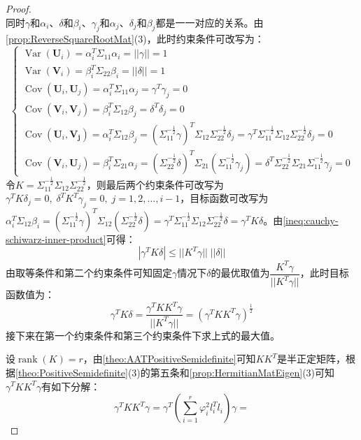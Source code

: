 \begin{proof}
\begin{equation*}
	\end{equation*}
	同时$\gamma$和$\alpha_i$、$\delta$和$\beta_i$、$\gamma_j$和$\alpha_j$、$\delta_j$和$\beta_j$都是一一对应的关系。由\cref{prop:ReverseSquareRootMat}(3)，此时约束条件可改写为：
	\begin{equation*}
		\begin{cases}
			\operatorname{Var}(\mathbf{U}_i)=\alpha_i^T\Sigma_{11}\alpha_i=||\gamma||=1 \\
			\operatorname{Var}(\mathbf{V}_i)=\beta_i^T\Sigma_{22}\beta_i=||\delta||=1 \\
			\operatorname{Cov}(\mathbf{U}_i,\mathbf{U}_j)=\alpha_i^T\Sigma_{11}\alpha_j=\gamma^T\gamma_j=0 \\
			\operatorname{Cov}(\mathbf{V}_i,\mathbf{V}_j)=\beta_i^T\Sigma_{12}\beta_j=\delta^T\delta_j=0 \\
			\operatorname{Cov}(\mathbf{U}_i,\mathbf{V_j})=\alpha_i^T\Sigma_{12}\beta_j=(\Sigma_{11}^{-\frac{1}{2}}\gamma)^T\Sigma_{12}\Sigma_{22}^{-\frac{1}{2}}\delta_j=\gamma^T\Sigma_{11}^{-\frac{1}{2}}\Sigma_{12}\Sigma_{22}^{-\frac{1}{2}}\delta_j=0 \\
			\operatorname{Cov}(\mathbf{V}_i,\mathbf{U}_j)=\beta_i^T\Sigma_{21}\alpha_j=(\Sigma_{22}^{-\frac{1}{2}}\delta)^T\Sigma_{21}(\Sigma_{11}^{-\frac{1}{2}}\gamma_j)=\delta^T\Sigma_{22}^{-\frac{1}{2}}\Sigma_{21}\Sigma_{11}^{-\frac{1}{2}}\gamma_j=0
		\end{cases}
	\end{equation*}
	令$K=\Sigma_{11}^{-\frac{1}{2}}\Sigma_{12}\Sigma_{22}^{-\frac{1}{2}}$，则最后两个约束条件可改写为$\gamma^TK\delta_j=0,\;\delta^TK^T\gamma_j=0,\;j=1,2,\dots,i-1$，目标函数可改写为$\alpha_i^T\Sigma_{12}\beta_i=(\Sigma_{11}^{-\frac{1}{2}}\gamma)^T\Sigma_{12}(\Sigma_{22}^{-\frac{1}{2}}\delta)=\gamma^T\Sigma_{11}^{-\frac{1}{2}}\Sigma_{12}\Sigma_{22}^{-\frac{1}{2}}\delta=\gamma^TK\delta$。由\cref{ineq:cauchy-schiwarz-inner-product}可得：
	\begin{equation*}
		|\gamma^TK\delta|\leqslant||K^T\gamma||\;||\delta||
	\end{equation*}
	由取等条件和第二个约束条件可知固定$\gamma$情况下$\delta$的最优取值为$\dfrac{K^T\gamma}{||K^T\gamma||}$，此时目标函数值为：
	\begin{equation*}
		\gamma^TK\delta=\frac{\gamma^TKK^T\gamma}{||K^T\gamma||}=(\gamma^TKK^T\gamma)^\frac{1}{2}
	\end{equation*}
	接下来在第一个约束条件和第三个约束条件下求上式的最大值。\par
	设$\operatorname{rank}(K)=r$，由\cref{theo:AATPositiveSemidefinite}可知$KK^T$是半正定矩阵，根据\cref{theo:PositiveSemidefinite}(3)的第五条和\cref{prop:HermitianMatEigen}(3)可知$\gamma^TKK^T\gamma$有如下分解：
	\begin{equation*}
		\gamma^TKK^T\gamma=\gamma^T\left(\sum_{i=1}^{r}\varphi_i^2l_i^Tl_i\right)\gamma=
	\end{equation*}
\end{proof}